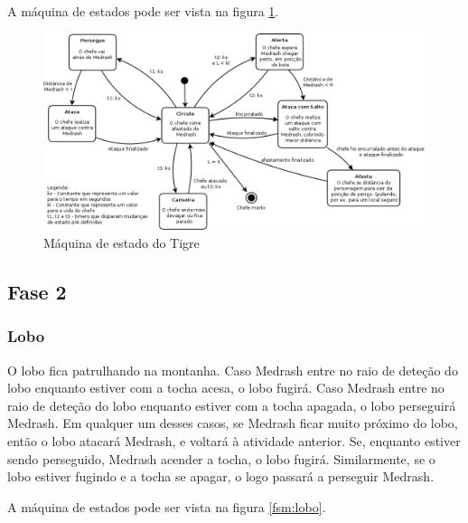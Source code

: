 A máquina de estados pode ser vista na figura \ref{fsm:tigre}.

\begin{figure}[!ht]
 \centering
 \includegraphics[scale=0.4]{ia_tigre.png}
 \caption{Máquina de estado do Tigre}
 \label{fsm:tigre}
\end{figure}

\subsection{Fase 2}

\subsubsection{Lobo}

O lobo fica patrulhando na montanha. Caso Medrash entre no raio de
deteção do lobo enquanto estiver com a tocha acesa, o lobo fugirá. Caso
Medrash entre no raio de deteção do lobo enquanto estiver com a tocha
apagada, o lobo perseguirá Medrash. Em qualquer um desses casos, se
Medrash ficar muito próximo do lobo, então o lobo atacará Medrash, e
voltará à atividade anterior.
Se, enquanto estiver sendo perseguido, Medrash acender a tocha,
o lobo fugirá. Similarmente, se o lobo estiver fugindo e a tocha se apagar,
o logo passará a perseguir Medrash.

A máquina de estados pode ser vista na figura \ref{fsm:lobo}.

